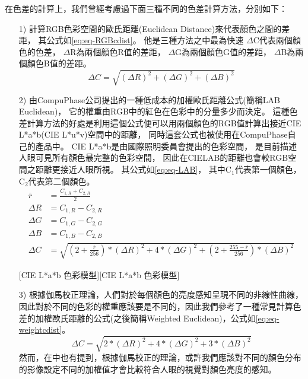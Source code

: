 \documentclass[class=NCU_thesis, crop=false]{standalone}
\begin{document}
			在色差的計算上，我們曾經考慮過下面三種不同的色差計算方法，分別如下：
			\begin{itemize}
			  \item [1)] 
			  	計算RGB色彩空間的歐氏距離(Euclidean Distance)來代表顏色之間的差距，
			  	其公式如\cref{eq:eq-RGBcdist}。
			  	他是三種方法之中最為快速
			  	$\Delta$C代表兩個顏色的色差，
			  	$\Delta$R為兩個顏色R值的差距，
			  	$\Delta$G為兩個顏色G值的差距，
			  	$\Delta$B為兩個顏色B值的差距。
			  	\begin{equation}
			    \label{eq:eq-RGBcdist}
			    	\Delta C = \sqrt{(\Delta R)^2 + (\Delta G)^2 + (\Delta B)^2}
				\end{equation}

			  \item [2)]
			  	由CompuPhase公司提出的一種低成本的加權歐氏距離公式\cite{LABformula}(簡稱LAB Euclidean)，
			  	它的權重由RGB中的紅色在色彩中的分量多少而決定。
			  	這種色差計算方法的好處是利用這個公式便可以用兩個顏色的RGB值計算出接近CIE L*a*b(CIE L*u*v)空間中的距離，
			  	同時這套公式也被使用在CompuPhase自己的產品中。
			  	CIE L*a*b是由國際照明委員會提出的色彩空間，
			  	是目前描述人眼可見所有顏色最完整的色彩空間，
			  	因此在CIELAB的距離也會較RGB空間之距離更接近人眼所視。
			  	其公式如\cref{eq:eq-LAB}，
			  	其中C$_{1}$代表第一個顏色，
			  	C$_{2}$代表第二個顏色。
			  	\begin{equation}
			    \label{eq:eq-LAB}
			    \begin{split}
			    	\overline{r} & = \frac{C_{1,R} + C_{2,R}}{2} \\
			    	\Delta R & = C_{1,R} - C_{2,R} \\
			    	\Delta G & = C_{1,G} - C_{2,G} \\
			    	\Delta B & = C_{1,B} - C_{2,B} \\
			    	\Delta C & = \sqrt{(2 + \frac{\overline{r}}{256}) * (\Delta R)^2 + 4 * (\Delta G)^2 + (2 + \frac{255 - \overline{r}}{256}) * (\Delta B)^2}
			    \end{split}
				\end{equation}

				[CIE L*a*b 色彩模型][CIE L*a*b 色彩模型]
				

			  \item [3)]
			  	根據伽馬校正理論，人們對於每個顏色的亮度感知呈現不同的非線性曲線，因此對於不同的色彩的權重應該要是不同的，因此我們參考了一種常見計算色差的加權歐氏距離的公式(之後簡稱Weighted Euclidean)，公式如\cref{eq:eq-weightcdist}。
			  	\begin{equation}
			    \label{eq:eq-weightcdist}
			    	\Delta C = \sqrt{2 * (\Delta R)^2 + 4 * (\Delta G)^2 + 3 * (\Delta B)^2}
				\end{equation}
				然而，在\cite{LABformula}中也有提到，根據伽馬校正的理論，或許我們應該對不同的顏色分布的影像設定不同的加權值才會比較符合人眼的視覺對顏色亮度的感知。
			\end{itemize}
\end{document}
